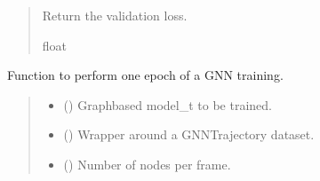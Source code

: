 \documentclass[a4paper,10pt,english]{report}
\begin{document}
\begin{fulllineitems}
\begin{quote}
\begin{description}
\begin{itemize}
\end{itemize}

\sphinxAtStartPar
Return the validation loss.

\sphinxAtStartPar
float

\end{description}\end{quote}

\end{fulllineitems}


\begin{fulllineitems}
\label{\detokenize{NNucleate:NNucleate.training.train_gnn}}
\pysigstartsignatures
{}
\pysigstopsignatures
\sphinxAtStartPar
Function to perform one epoch of a GNN training.
\begin{quote}\begin{description}
\begin{itemize}
\item {} 
\sphinxAtStartPar
{} ({\hyperref[\detokenize{NNucleate:NNucleate.models.GNNCV}]{}}) \textendash{} Graph\sphinxhyphen{}based model\_t to be trained.

\item {} 
\sphinxAtStartPar
{} () \textendash{} Wrapper around a GNNTrajectory dataset.

\item {} 
\sphinxAtStartPar
{} (\sphinxstyleliteralemphasis{\sphinxupquote{, }}) \textendash{} Number of nodes per frame.


\end{itemize}
\end{description}
\end{quote}
\end{fulllineitems}
\end{document}
